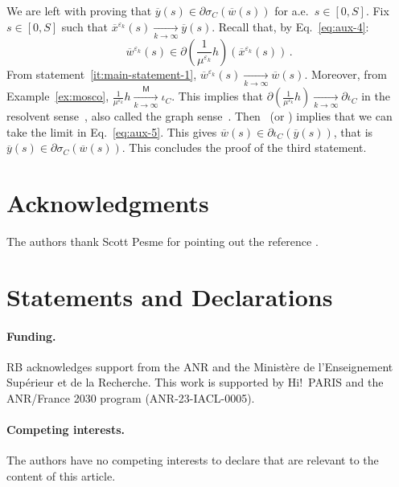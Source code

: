 \documentclass[11pt,english,reqno]{article}
\theoremstyle{plain}
\theoremstyle{definition}
\theoremstyle{remark}
\numberwithin{equation}{section}
\begin{document}
\begin{enumerate}[label=(\alph*)]
	We are left with proving that $\overline{y}(s) \in \partial \sigma_C(\overline{w}(s))$ for a.e.~$s \in [0,S]$. Fix $s \in [0,S]$ such that $\overline{x}^{\varepsilon_k}(s) \xrightarrow[k\to\infty]{} \overline{y}(s)$. Recall that, by Eq.~\eqref{eq:aux-4}:
\begin{equation}
	\label{eq:aux-5}
	\overline{w}^{\varepsilon_k}(s) \in \partial \left(\frac{1}{\mu^{\varepsilon_k}} h \right) (\overline{x}^{\varepsilon_k}(s)) \, .
\end{equation}
From statement~\ref{it:main-statement-1}, $\overline{w}^{\varepsilon_k}(s) \xrightarrow[k\to\infty]{} \overline{w}(s)$. Moreover, from Example~\ref{ex:mosco}, $\frac{1}{\mu^{\varepsilon_k}} h \xrightarrow[k\to\infty]{\mathsf{M}} \iota_C$. This implies that $\partial \left(\frac{1}{\mu^{\varepsilon_k}} h \right) \xrightarrow[k\to\infty]{} \partial \iota_C$ in the resolvent sense~\cite{attouch1977convergence}, also called the graph sense~\cite[Def.~3.58]{attouch1984variational}. Then~\cite[statement (1.7)]{attouch1977convergence} (or \cite[Prop.~3.59]{attouch1984variational}) implies that we can take the limit in Eq.~\eqref{eq:aux-5}. This gives $\overline{w}(s) \in \partial \iota_C(\overline{y}(s))$, that is $\overline{y}(s) \in \partial \sigma_C(\overline{w}(s))$. This concludes the proof of the third statement.
\end{enumerate}

\section*{Acknowledgments}

The authors thank Scott Pesme for pointing out the reference \cite{attouch2004singular}.

\section*{Statements and Declarations}

\paragraph*{Funding.} RB acknowledges support from the ANR and the Ministère de l’Enseignement Supérieur et de la Recherche. This work is supported by Hi!~PARIS and the ANR/France 2030 program (ANR-23-IACL-0005).

\paragraph*{Competing interests.} The authors have no competing interests to declare that are relevant to the content of this article.
\end{document}
